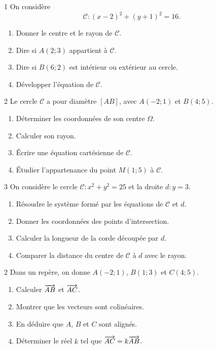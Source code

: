 \begin{exo}{1}
On considère
\[
 \mathcal C:(x-2)^2+(y+1)^2=16.
\]
\begin{enumerate}
  \item Donner le centre et le rayon de $\mathcal C$.
  \item Dire si $A(2;3)$ appartient à $\mathcal C$.
  \item Dire si $B(6;2)$ est intérieur ou extérieur au cercle.
  \item Développer l'équation de $\mathcal C$.
\end{enumerate}
\end{exo}

\begin{exo}{2}
Le cercle $\mathcal C$ a pour diamètre $[AB]$, avec $A(-2;1)$ et $B(4;5)$.
\begin{enumerate}
  \item Déterminer les coordonnées de son centre $\Omega$.
  \item Calculer son rayon.
  \item Écrire une équation cartésienne de $\mathcal C$.
  \item Étudier l'appartenance du point $M(1;5)$ à $\mathcal C$.
\end{enumerate}
\end{exo}

\begin{exo}{3}
On considère le cercle $\mathcal C:x^2+y^2=25$ et la droite $d:y=3$.
\begin{enumerate}
  \item Résoudre le système formé par les équations de $\mathcal C$ et $d$.
  \item Donner les coordonnées des points d'intersection.
  \item Calculer la longueur de la corde découpée par $d$.
  \item Comparer la distance du centre de $\mathcal C$ à $d$ avec le rayon.
\end{enumerate}
\end{exo}

\begin{exo}{2}
Dans un repère, on donne $A(-2;1)$, $B(1;3)$ et $C(4;5)$.
\begin{enumerate}
  \item Calculer $\overrightarrow{AB}$ et $\overrightarrow{AC}$.
  \item Montrer que les vecteurs sont colinéaires.
  \item En déduire que $A$, $B$ et $C$ sont alignés.
  \item Déterminer le réel $k$ tel que $\overrightarrow{AC}=k\overrightarrow{AB}$.
\end{enumerate}
\end{exo}

